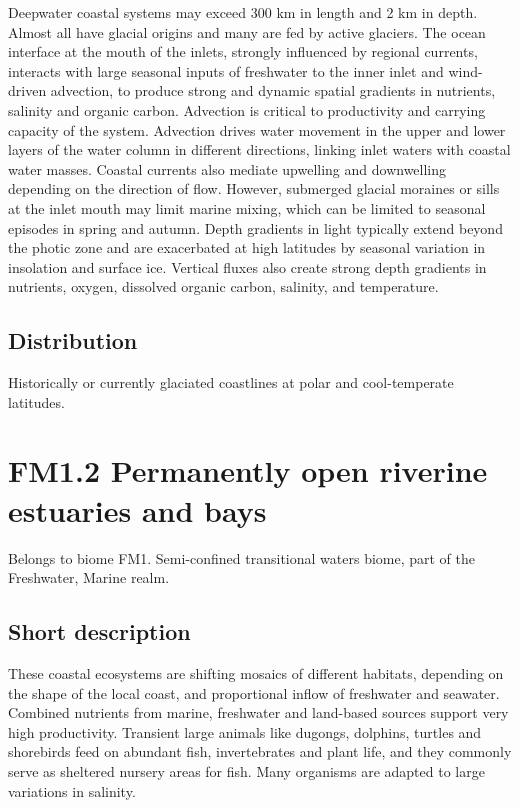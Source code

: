 \documentclass[
  letterpaper,
  DIV=11,
  numbers=noendperiod]{scrartcl}
\begin{document}
Deepwater coastal systems may exceed 300 km in length and 2 km in depth.
Almost all have glacial origins and many are fed by active glaciers. The
ocean interface at the mouth of the inlets, strongly influenced by
regional currents, interacts with large seasonal inputs of freshwater to
the inner inlet and wind-driven advection, to produce strong and dynamic
spatial gradients in nutrients, salinity and organic carbon. Advection
is critical to productivity and carrying capacity of the system.
Advection drives water movement in the upper and lower layers of the
water column in different directions, linking inlet waters with coastal
water masses. Coastal currents also mediate upwelling and downwelling
depending on the direction of flow. However, submerged glacial moraines
or sills at the inlet mouth may limit marine mixing, which can be
limited to seasonal episodes in spring and autumn. Depth gradients in
light typically extend beyond the photic zone and are exacerbated at
high latitudes by seasonal variation in insolation and surface ice.
Vertical fluxes also create strong depth gradients in nutrients, oxygen,
dissolved organic carbon, salinity, and temperature.

\subsection{Distribution}\label{distribution-131}

Historically or currently glaciated coastlines at polar and
cool-temperate latitudes.

\section{FM1.2 Permanently open riverine estuaries and
bays}\label{fm1.2-permanently-open-riverine-estuaries-and-bays-1}

Belongs to biome FM1. Semi-confined transitional waters biome, part of
the Freshwater, Marine realm.

\subsection{Short description}\label{short-description-132}

These coastal ecosystems are shifting mosaics of different habitats,
depending on the shape of the local coast, and proportional inflow of
freshwater and seawater. Combined nutrients from marine, freshwater and
land-based sources support very high productivity. Transient large
animals like dugongs, dolphins, turtles and shorebirds feed on abundant
fish, invertebrates and plant life, and they commonly serve as sheltered
nursery areas for fish. Many organisms are adapted to large variations
in salinity.
\end{document}
